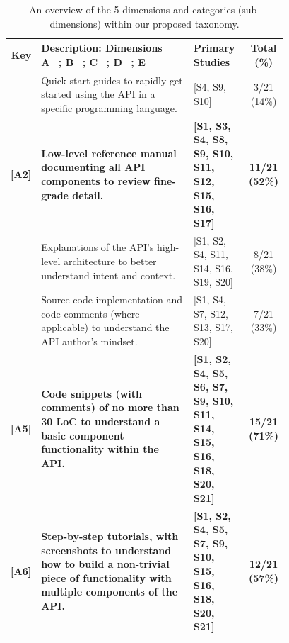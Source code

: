 


\def\cn{}
\def\cy{\checkmark}

\begin{table}[hbt]
  \caption{An overview of the 5 dimensions and categories (sub-dimensions) within our proposed taxonomy.}
  \label{esem2019:tab:taxonomy}
  \begin{tabular}{|rp{0.58\linewidth}||p{0.2\linewidth}|c|}
    \hline

    \textbf{Key} &
    \textbf{Description: Dimensions A=\dima{}; B=\dimb{}; C=\dimc{}; D=\dimd{}; E=\dime{}} &
    \textbf{Primary Studies } &
    \textbf{Total (\%)} \\

    \hline
    \hline
    [A1]&
    Quick-start guides to rapidly get started using the API in a specific programming language.
    &
    [S4, S9, S10] &
    3/21 (14\%)\\

    \hline
    \textbf{[A2]}&
    \textbf{Low-level reference manual documenting all API components to review fine-grade detail.}
    &
    \textbf{[S1, S3, S4, S8, S9, S10, S11, S12, S15, S16, S17]} &
    \textbf{11/21 (52\%)}\\

    \hline
    [A3]&
    Explanations of the API's high-level architecture to better understand intent and context.
    &
    [S1, S2, S4, S11, S14, S16, S19, S20] &
    8/21 (38\%)\\

    \hline
    [A4]&
    Source code implementation and code comments (where applicable) to understand the API author's mindset.
    &
    [S1, S4, S7, S12, S13, S17, S20] &
    7/21 (33\%)\\

    \hline
    \textbf{[A5]}&
    \textbf{Code snippets (with comments) of no more than 30 LoC to understand a basic component functionality within the API.}
    &
    \textbf{[S1, S2, S4, S5, S6, S7, S9, S10, S11, S14, S15, S16, S18, S20, S21]} &
    \textbf{15/21 (71\%)}\\

    \hline
    \textbf{[A6]}&
    \textbf{Step-by-step tutorials, with screenshots to understand  how to build a non-trivial piece of functionality with multiple components of the API.}
    &
    \textbf{[S1, S2, S4, S5, S7, S9, S10, S15, S16, S18, S20, S21]} &
    \textbf{12/21 (57\%)}\\


\end{tabular}
\end{table}
